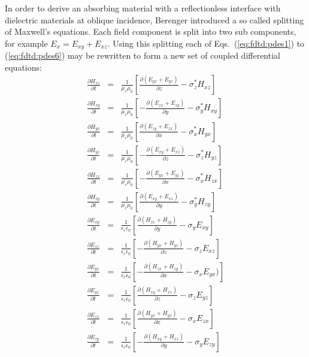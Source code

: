 \documentclass[a4paper, 12pt]{article}
\newcommand{\eqr}[2]{Eqs.\ (\ref{#1}) to (\ref{#2})}
\begin{document}
	In order to derive an absorbing material with a reflectionless
	interface with dielectric materials at oblique incidence, Berenger
	introduced a so called splitting of Maxwell's equations. Each field
	component is split into two sub components, for example
	$E_x=E_{xy}+E_{xz}$. Using this splitting each of
	\eqr{eq:fdtd:pdes1}{eq:fdtd:pdes6} may be rewritten to form a new set
	of coupled differential equations:
	\begin{eqnarray}
		\label{eq:fdtd:split1a}
		\frac{\partial H_{xz}}{\partial t}&=&\frac{1}{\mu_r\mu_0}\left[\frac{\partial (E_{yx}+E_{yz})}{\partial z}
		- \sigma_z^*H_{xz}  \right]\\
		\label{eq:fdtd:split1b}
		\frac{\partial H_{xy}}{\partial t}&=&\frac{1}{\mu_r\mu_0}\left[
		-\frac{\partial (E_{zx} + E_{zy})}{\partial y} - \sigma_y^*H_{xy}  \right]\\
		\label{eq:fdtd:split2a}
		\frac{\partial H_{yx}}{\partial
			t}&=&\frac{1}{\mu_r\mu_0}\left[\frac{\partial (E_{zy} + E_{zx})}{\partial x}
		- \sigma_x^*H_{yx}  \right]\\
		\label{eq:fdtd:split2b}
		\frac{\partial H_{yz}}{\partial t}&=&\frac{1}{\mu_r\mu_0}\left[
		-\frac{\partial (E_{xy} + E_{xz})}{\partial z} - \sigma_z^*H_{yz}  \right]\\
		\label{eq:fdtd:split3a}
		\frac{\partial H_{zx}}{\partial t}&=&\frac{1}{\mu_r\mu_0}\left[
		-\frac{\partial (E_{yx} + E_{yz})}{\partial x} - \sigma_x^*H_{zx}  \right]\\
		\label{eq:fdtd:split3b}
		\frac{\partial H_{zy}}{\partial t}&=&\frac{1}{\mu_r\mu_0}\left[\frac{\partial (E_{xy}+E_{xz})}{\partial y}
		- \sigma_y^*H_{zy}  \right]\\
		\label{eq:fdtd:split4a}
		\frac{\partial E_{xy}}{\partial
			t}&=&\frac{1}{\epsilon_r\epsilon_0}\left[\frac{\partial (H_{zx} + H_{zy})}{\partial y}
		-\sigma_y  E_{xy}  \right]\\
		\label{eq:fdtd:split4b}
		\frac{\partial E_{xz}}{\partial
			t}&=&\frac{1}{\epsilon_r\epsilon_0}\left[ -\frac{\partial (H_{yx} +
			H_{yz}) }{\partial z} - \sigma_z E_{xz}  \right]\\
		\label{eq:fdtd:split5a}
		\frac{\partial E_{yx}}{\partial t}&=&\frac{1}{\epsilon_r\epsilon_0}\left[
		-\frac{\partial (H_{zx} + H_{zy})}{\partial x} - \sigma_x  E_{yx})  \right]\\
		\label{eq:fdtd:split5b}
		\frac{\partial E_{yz}}{\partial
			t}&=&\frac{1}{\epsilon_r\epsilon_0}\left[\frac{\partial (H_{xy} + H_{xz})}{\partial z}
		- \sigma_z  E_{yz}  \right]\\
		\label{eq:fdtd:split6a}
		\frac{\partial E_{zx}}{\partial t}&=&\frac{1}{\epsilon_r\epsilon_0}\left[\frac{\partial (H_{yx}+H_{yz})}{\partial x}
		- \sigma_x  E_{zx}  \right]\\
		\label{eq:fdtd:split6b}
		\frac{\partial E_{zy}}{\partial
			t}&=&\frac{1}{\epsilon_r\epsilon_0}\left[ -\frac{\partial (H_{xy} + H_{xz})}{\partial y} - \sigma_y E_{zy}  \right]
	\end{eqnarray}
\end{document}
